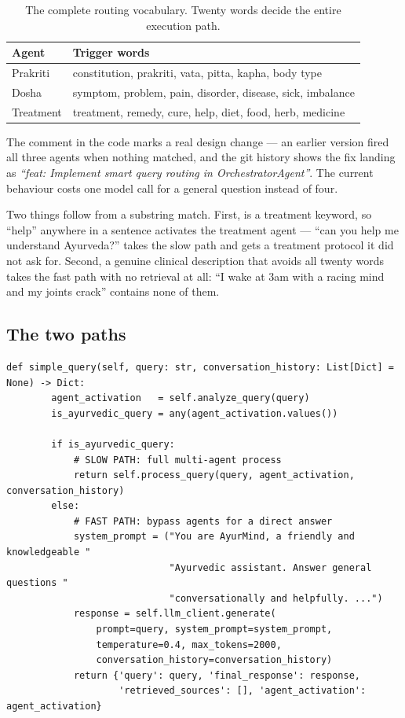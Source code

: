 \begin{table}[H]
\centering
\small
\begin{tabularx}{\textwidth}{@{}l X@{}}
\toprule
\textbf{Agent} & \textbf{Trigger words} \\
\midrule
Prakriti & constitution, prakriti, vata, pitta, kapha, body type \\
Dosha & symptom, problem, pain, disorder, disease, sick, imbalance \\
Treatment & treatment, remedy, cure, help, diet, food, herb, medicine \\
\bottomrule
\end{tabularx}
\caption{The complete routing vocabulary. Twenty words decide the entire execution path.}
\end{table}

The comment in the code marks a real design change --- an earlier version fired all three agents when nothing matched, and the git history shows the fix landing as \emph{``feat: Implement smart query routing in OrchestratorAgent''}. The current behaviour costs one model call for a general question instead of four.

Two things follow from a substring match. First,  is a treatment keyword, so ``help'' anywhere in a sentence activates the treatment agent --- ``can you help me understand Ayurveda?'' takes the slow path and gets a treatment protocol it did not ask for. Second, a genuine clinical description that avoids all twenty words takes the fast path with no retrieval at all: ``I wake at 3am with a racing mind and my joints crack'' contains none of them.

\subsection{The two paths}

\begin{lstlisting}[style=py,firstnumber=149]
    def simple_query(self, query: str, conversation_history: List[Dict] = None) -> Dict:
        agent_activation   = self.analyze_query(query)
        is_ayurvedic_query = any(agent_activation.values())

        if is_ayurvedic_query:
            # SLOW PATH: full multi-agent process
            return self.process_query(query, agent_activation, conversation_history)
        else:
            # FAST PATH: bypass agents for a direct answer
            system_prompt = ("You are AyurMind, a friendly and knowledgeable "
                             "Ayurvedic assistant. Answer general questions "
                             "conversationally and helpfully. ...")
            response = self.llm_client.generate(
                prompt=query, system_prompt=system_prompt,
                temperature=0.4, max_tokens=2000,
                conversation_history=conversation_history)
            return {'query': query, 'final_response': response,
                    'retrieved_sources': [], 'agent_activation': agent_activation}
\end{lstlisting}

